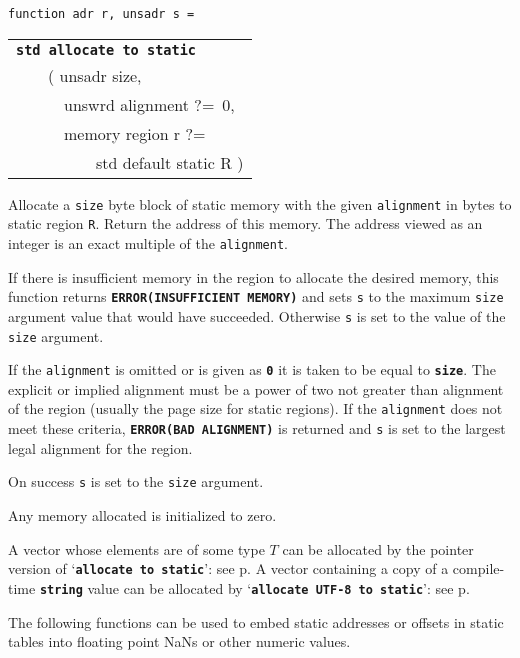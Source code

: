 \documentclass[12pt]{article}
\makeatletter
\newcommand{\TT}[1]{{\tt \bfseries #1}}
\newcommand{\ttstdkey}[1]{\TT{std #1}\index{#1@{\tt std #1}}}
\newcommand{\pagref}[1]{p\pageref{#1}}
\newenvironment{indpar}[1][0.3in]%
	{\begin{list}{}%
		     {\setlength{\itemsep}{0in}%
		      \setlength{\topsep}{0in}%
		      \setlength{\parsep}{1ex}%
		      \setlength{\labelwidth}{#1}%
		      \setlength{\leftmargin}{#1}%
		      \addtolength{\leftmargin}{\labelsep}}%
	 \item}%
	{\end{list}}
\makeatother
\begin{document}
\begin{indpar}

{\tt function adr r, unsadr s = \\
\hspace*{1in}\begin{tabular}[t]{@{}l@{}}
	     \ttstdkey{allocate to static} \\
	     ~~~~( unsadr size, \\
	     ~~~~~~unswrd alignment ?=~0, \\
	     ~~~~~~memory region r ?= \\
	     ~~~~~~~~~~std default static R ) \\
	     \end{tabular}}

\begin{indpar}
Allocate a {\tt size} byte block of static memory with the given
{\tt alignment} in bytes to static region {\tt R}.
Return
the address of this memory.  The address viewed as an
integer is an exact multiple of the {\tt alignment}.

If there is insufficient memory
in the region to allocate the desired memory,
this function returns \TT{ERROR(INSUFFICIENT MEMORY)} and sets
{\tt s} to the maximum {\tt size} argument value that
would have succeeded.  Otherwise {\tt s} is set to the value
of the {\tt size} argument.

If the {\tt alignment} is omitted or is given as \TT{0} it is taken
to be equal to \TT{size}.  The explicit or implied
alignment must be a power of two not greater than alignment of the
region (usually the page size for static regions).  If the {\tt alignment}
does not meet these criteria, \TT{ERROR(BAD ALIGNMENT)} is returned
and {\tt s} is set to the largest legal alignment for the region.

On success {\tt s} is set to the {\tt size} argument.

Any memory allocated is initialized to zero.
\end{indpar}

\end{indpar}

A vector whose elements are of some type $T$ can be allocated by
the pointer version of `\TT{allocate to static}': see
\pagref{POINTER-ALLOCATE-TO-STATIC}.  A vector containing a copy
of a compile-time \TT{string} value can be allocated by
`\TT{allocate UTF-8 to static}': see
\pagref{POINTER-ALLOCATE-UTF-8-TO-STATIC}.

The following functions can be used to embed static addresses or offsets
in static tables into
floating point NaNs or other numeric values.
\end{document}
